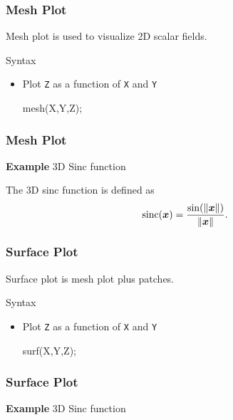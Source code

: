 \documentclass{beamer}  %
\begin{document}
\begin{frame}[fragile]
\frametitle{Mesh Plot}
Mesh plot is used to visualize 2D scalar fields.
\begin{block}{Syntax}
\begin{itemize}
    \item Plot \texttt{Z} as a function of \texttt{X} and \texttt{Y}
          \begin{matlabcodebeamer}[numbers=none,frame=none]
          mesh(X,Y,Z);
          \end{matlabcodebeamer}
\end{itemize}
\end{block}

\end{frame}
\begin{frame}[fragile]
\frametitle{Mesh Plot}
\textbf{Example} 3D Sinc function

The 3D sinc function is defined as
\begin{equation}
    \operatorname{sinc}(\boldsymbol{x}) = \frac{\sin(\| \boldsymbol{x} \|)}{\| \boldsymbol{x} \|}.
\end{equation}\pause

\setcounter{subfigure}{0}
\begin{figure}
    \centering
\end{figure}

\end{frame}
\begin{frame}[fragile]
\frametitle{Surface Plot}
Surface plot is mesh plot plus patches.
\begin{block}{Syntax}
\begin{itemize}
    \item Plot \texttt{Z} as a function of \texttt{X} and \texttt{Y}
          \begin{matlabcodebeamer}[numbers=none,frame=none]
          surf(X,Y,Z);
          \end{matlabcodebeamer}
\end{itemize}
\end{block}

\end{frame}
\begin{frame}[fragile]
\frametitle{Surface Plot}
\textbf{Example} 3D Sinc function

\setcounter{subfigure}{0}
\begin{figure}
    \centering
\end{figure}

\end{frame}
\end{document}
